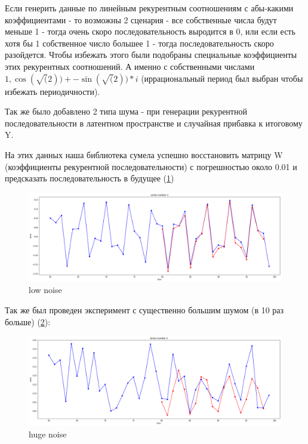 \documentclass[11pt]{article}
\begin{document}
Если генерить данные по линейным рекурентным соотношениям с абы-какими коэффициентами - то возможны 2 сценария - все собственные числа будут меньше 1 - тогда очень скоро последовательность выродится в 0, или если есть хотя бы 1 собственное число большее 1 - тогда последовательность скоро разойдется. Чтобы избежать этого были подобраны специальные коэффициенты этих рекурентных соотношений. А именно с собственными числами $1, \cos(\sqrt(2)) +- \sin(\sqrt(2)) * i$
(иррациональный период был выбран чтобы избежать периодичности). 

Так же было добавлено 2 типа шума - при генерации рекурентной последовательности в латентном пространстве и случайная прибавка к итоговому Y.

На этих данных наша библиотека сумела успешно восстановить матрицу W (коэффициенты рекурентной последовательности) с погрешностью около 0.01 и предсказать последовательность в будущее (\ref{fig:synthetic_low_noise})

\begin{figure}[!htb]
\includegraphics[width = 15cm]{synthetic_low_noise.png}
\caption{low noise}
\label{fig:synthetic_low_noise}
\end{figure} 


Так же был проведен эксперимент с существенно большим шумом (в 10 раз больше)
(\ref{fig:huge_noise}): 

\begin{figure}[!htb]
\includegraphics[width = 15cm]{huge_noise.png}
\caption{huge noise}
\label{fig:huge_noise}
\end{figure} 
\end{document}
